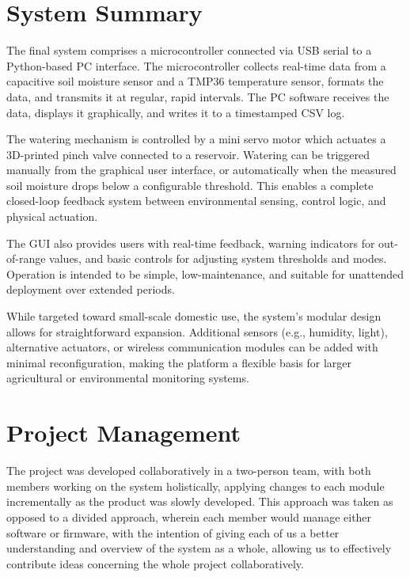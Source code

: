 \documentclass[a4paper,11pt]{article}
\begin{document}
\section{System Summary}
\label{sec:summary}

The final system comprises a microcontroller
connected via USB serial to a Python-based PC interface. 
The microcontroller collects real-time data from a capacitive soil moisture sensor 
and a TMP36 temperature sensor, formats the data, 
and transmits it at regular, rapid intervals. 
The PC software receives the data, displays it graphically, 
and writes it to a timestamped CSV log.

The watering mechanism is controlled by a mini servo motor 
which actuates a 3D-printed pinch valve connected to a reservoir. 
Watering can be triggered manually from the graphical user interface, 
or automatically when the measured soil moisture drops below 
a configurable threshold. 
This enables a complete closed-loop feedback system 
between environmental sensing, control logic, 
and physical actuation.

The GUI also provides users with real-time feedback, 
warning indicators for out-of-range values, 
and basic controls for adjusting system thresholds and modes. 
Operation is intended to be simple, low-maintenance, 
and suitable for unattended deployment over extended periods.

While targeted toward small-scale domestic use, 
the system's modular design allows for straightforward expansion. 
Additional sensors (e.g., humidity, light), 
alternative actuators, or wireless communication modules 
can be added with minimal reconfiguration, 
making the platform a flexible basis for 
larger agricultural or environmental monitoring systems.

\section{Project Management}
\label{sec:project_management}

The project was developed collaboratively in a two-person team, 
with both members working on the system holistically,
applying changes to each module incrementally
as the product was slowly developed.
This approach was taken as opposed to a divided approach,
wherein each member would manage either software or firmware,
with the intention of giving each of us a better understanding 
and overview of the system as a whole,
allowing us to effectively contribute ideas 
concerning the whole project collaboratively. 
\end{document}
